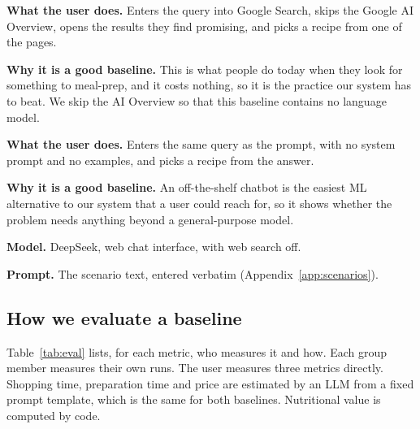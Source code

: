 \documentclass[11pt]{article}
\begin{document}
\begin{tcbraster}[raster columns=2, raster equal height, raster column skip=10pt, raster before skip=8pt, raster after skip=4pt]
\begin{tcolorbox}[card, title={A \textperiodcentered{} Non-ML baseline: Google Search}]
\small
\textbf{What the user does.}
Enters the query into Google Search, skips the Google AI Overview, opens the results they find promising,
and picks a recipe from one of the pages.

\textbf{Why it is a good baseline.}
This is what people do today when they look for something to meal-prep, and it costs nothing,
so it is the practice our system has to beat.
We skip the AI Overview so that this baseline contains no language model.
\end{tcolorbox}
\begin{tcolorbox}[card, title={B \textperiodcentered{} ML baseline: zero-shot LLM (DeepSeek)}]
\small
\textbf{What the user does.}
Enters the same query as the prompt, with no system prompt and no examples, and picks a recipe from the answer.

\textbf{Why it is a good baseline.}
An off-the-shelf chatbot is the easiest ML alternative to our system that a user could reach for,
so it shows whether the problem needs anything beyond a general-purpose model.

\textbf{Model.} DeepSeek, web chat interface, with web search off.

\textbf{Prompt.} The scenario text, entered verbatim (Appendix~\ref{app:scenarios}).
\end{tcolorbox}
\end{tcbraster}

\FloatBarrier
\subsection{How we evaluate a baseline}
\label{sec:eval}

Table~\ref{tab:eval} lists, for each metric, who measures it and how.
Each group member measures their own runs.
The user measures three metrics directly.
Shopping time, preparation time and price are estimated by an LLM from a fixed prompt template, which is the same for both baselines.
Nutritional value is computed by code.
\end{document}
